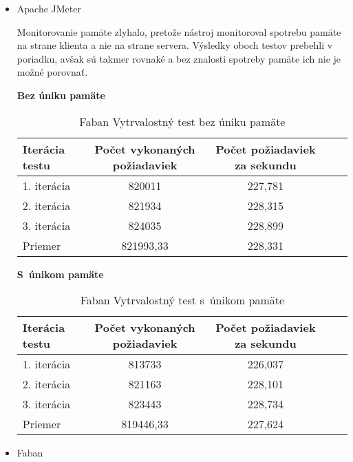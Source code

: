 \documentclass[12pt,oneside,final]{fithesis-utf8}
\begin{document}
\begin{itemize}

\item Apache JMeter

Monitorovanie pamäte zlyhalo, pretože nástroj monitoroval spotrebu pamäte na strane klienta a nie na strane servera. Výsledky oboch testov prebehli v poriadku, avšak sú takmer rovnaké a bez znalosti spotreby pamäte ich nie je možné porovnať.

\textbf{Bez úniku pamäte}

\begin{table}[H]
\begin{center}
\begin{tabular}{ | l | c | c | c | c |}
		\hline
		 \textbf{Iterácia testu} & \textbf{Počet vykonaných požiadaviek} & \textbf{Počet požiadaviek za sekundu} \\ \hline
		 1. iterácia & 820011 & 227,781 \\ \hline
		 2. iterácia & 821934 & 228,315 \\ \hline
		 3. iterácia & 824035 & 228,899 \\ \hline
		 Priemer & 821993,33 & 228,331 \\ \hline
		 
\end{tabular}
\end{center}
\caption{Faban Vytrvalostný test bez úniku pamäte}
\end{table}

\textbf{S~únikom pamäte}

\begin{table}[H]
\begin{center}
\begin{tabular}{ | l | c | c | c | c |}
		\hline
		 \textbf{Iterácia testu} & \textbf{Počet vykonaných požiadaviek} & \textbf{Počet požiadaviek za sekundu} \\ \hline
		 1. iterácia & 813733 & 226,037 \\ \hline
		 2. iterácia & 821163 & 228,101 \\ \hline
		 3. iterácia & 823443 & 228,734 \\ \hline
		 Priemer & 819446,33 & 227,624 \\ \hline
		 
\end{tabular}
\end{center}
\caption{Faban Vytrvalostný test s~únikom pamäte}
\end{table}

\item Faban


\end{itemize}
\end{document}
